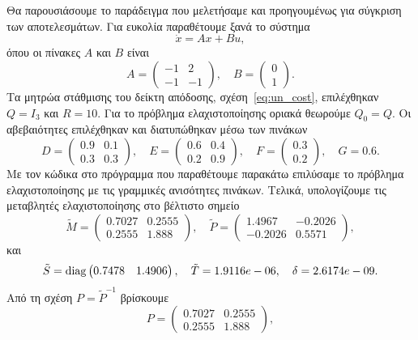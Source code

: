Θα παρουσιάσουμε το παράδειγμα που μελετήσαμε και προηγουμένως για σύγκριση των
αποτελεσμάτων. Για ευκολία παραθέτουμε ξανά το σύστημα
\[
    \dot{x} = Ax + Bu,
\]
όπου οι πίνακες \( A \) και \( B \) είναι
\[
    A =
    \begin{pmatrix}
        -1 & 2 \\
        -1 & -1
    \end{pmatrix}, \quad
    B = \begin{pmatrix}0 \\ 1\end{pmatrix}.
\]
Τα μητρώα στάθμισης του δείκτη απόδοσης, σχέση~\eqref{eq:un_cost}, επιλέχθηκαν
\( Q = I_3 \) και \( R = 10 \). Για το πρόβλημα ελαχιστοποίησης οριακά θεωρούμε
\( Q_0 = Q \). Οι αβεβαιότητες επιλέχθηκαν και διατυπώθηκαν μέσω των πινάκων
\[
    D =
    \begin{pmatrix}
        0.9 & 0.1 \\
        0.3 & 0.3
    \end{pmatrix},\quad
    E =
    \begin{pmatrix}
        0.6 & 0.4 \\
        0.2 & 0.9
    \end{pmatrix},\quad
    F =
    \begin{pmatrix}
        0.3 \\ 0.2
    \end{pmatrix},\quad
    G = 0.6.
\]
Με τον κώδικα στο πρόγραμμα  που παραθέτουμε παρακάτω επιλύσαμε το
πρόβλημα ελαχιστοποίησης με τις γραμμικές ανισότητες πινάκων. Τελικά,
υπολογίζουμε τις μεταβλητές ελαχιστοποίησης στο βέλτιστο σημείο
\[
    \tilde{M} =
    \begin{pmatrix}
        0.7027 & 0.2555 \\
        0.2555 & 1.888
    \end{pmatrix},\quad
    \tilde{P} =
    \begin{pmatrix}
        1.4967 & -0.2026 \\
        -0.2026 & 0.5571
    \end{pmatrix},
\]
και
\[
    \tilde{S} = \operatorname{diag}
    \begin{pmatrix}
        0.7478 & 1.4906
    \end{pmatrix},\quad
    \tilde{T} = 1.9116e-06, \quad
    \delta = 2.6174e-09.
\]
Από τη σχέση \( P = \tilde{P}^{-1} \) βρίσκουμε
\[
    P =
    \begin{pmatrix}
        0.7027 & 0.2555 \\
        0.2555 & 1.888
    \end{pmatrix},
\]
